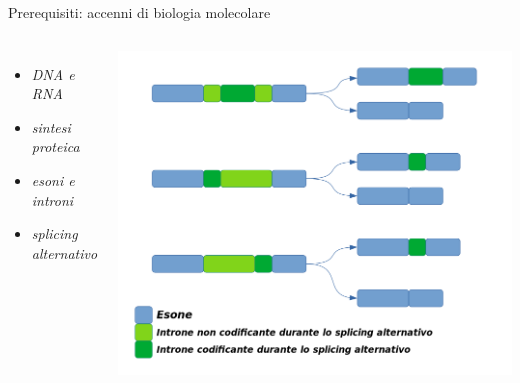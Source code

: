 \documentclass{beamer}
\begin{document}
\begin{tframe}{Prerequisiti: accenni di biologia molecolare}
  \begin{columns}
    \begin{itemize}
      \item \textit{DNA e RNA}
      \item \textit{sintesi proteica}
      \item \textit{esoni e introni}
      \item \textit{splicing alternativo}
    \end{itemize}

    
    \includegraphics[scale = 0.23]{img/splicing3.png}
  \end{columns}  
\end{tframe}
\end{document}

